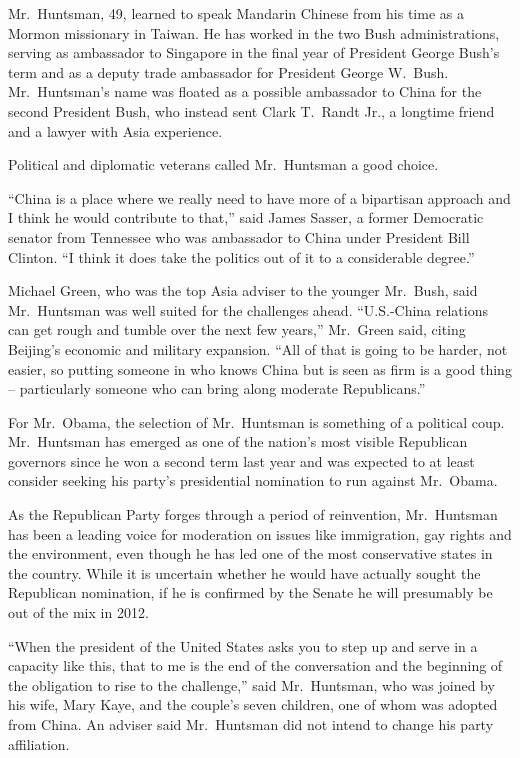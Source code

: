 \documentclass[12pt,a4paper,onecolumn]{article}
\begin{document}
Mr.~Huntsman, 49, learned to speak Mandarin Chinese from his time as a Mormon missionary in Taiwan.
He has worked in the two Bush administrations, serving as ambassador to Singapore in the final year
of President George Bush's term and as a deputy trade ambassador for President George W.~Bush.
Mr.~Huntsman's name was floated as a possible ambassador to China for the second President Bush, who
instead sent Clark T.~Randt Jr., a longtime friend and a lawyer with Asia experience.

Political and diplomatic veterans called Mr.~Huntsman a good choice.

``China is a place where we really need to have more of a bipartisan approach and I think he would
contribute to that,'' said James Sasser, a former Democratic senator from Tennessee who was
ambassador to China under President Bill Clinton. ``I think it does take the politics out of it to a
considerable degree.''

Michael Green, who was the top Asia adviser to the younger Mr.~Bush, said Mr.~Huntsman was well
suited for the challenges ahead. ``U.S.-China relations can get rough and tumble over the next few
years,'' Mr.~Green said, citing Beijing's economic and military expansion. ``All of that is going to
be harder, not easier, so putting someone in who knows China but is seen as firm is a good thing --
particularly someone who can bring along moderate Republicans.''

For Mr.~Obama, the selection of Mr.~Huntsman is something of a political coup. Mr.~Huntsman has
emerged as one of the nation's most visible Republican governors since he won a second term last
year and was expected to at least consider seeking his party's presidential nomination to run
against Mr.~Obama.

As the Republican Party forges through a period of reinvention, Mr.~Huntsman has been a leading
voice for moderation on issues like immigration, gay rights and the environment, even though he has
led one of the most conservative states in the country. While it is uncertain whether he would have
actually sought the Republican nomination, if he is confirmed by the Senate he will presumably be
out of the mix in 2012.

``When the president of the United States asks you to step up and serve in a capacity like this,
that to me is the end of the conversation and the beginning of the obligation to rise to the
challenge,'' said Mr.~Huntsman, who was joined by his wife, Mary Kaye, and the couple's seven
children, one of whom was adopted from China. An adviser said Mr.~Huntsman did not intend to change
his party affiliation.
\end{document}
